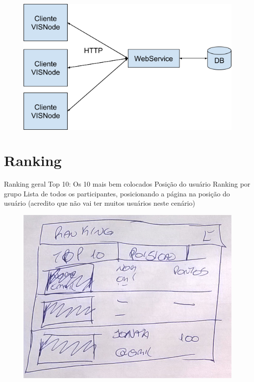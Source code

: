 \documentclass[
	12pt,				%
	oneside,			%
	a4paper,			%
	english,			%
	french,				%
	spanish,			%
	brazil,				%
	]{abntex2}
\begin{document}
\begin{figure}[ht]
\centering
\includegraphics[width=1\textwidth]{imagens/visnode_arquitetura.png}
\end{figure}

\section{Ranking}

Ranking geral
Top 10: Os 10 mais bem colocados 
Posição do usuário
Ranking por grupo
Lista de todos os participantes, posicionando a página na posição do usuário (acredito que não vai ter muitos usuários neste cenário) 

\begin{figure}[ht]
\centering
\includegraphics[width=1\textwidth]{imagens/proposta_ranking.png}
\end{figure}
\end{document}
